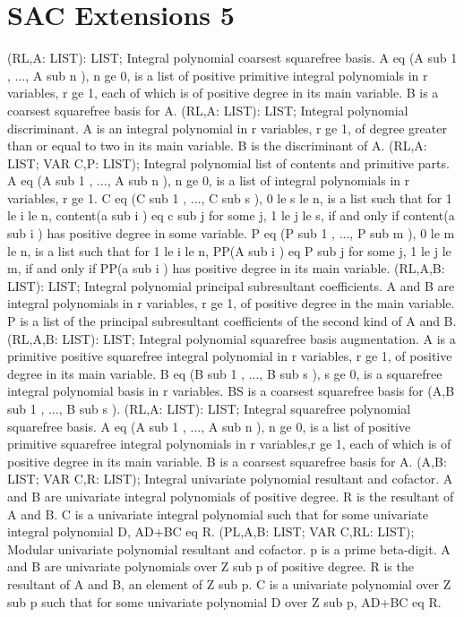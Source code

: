\section{ SAC Extensions 5  } 
 (RL,A: LIST): LIST; \eproc
\bcom Integral polynomial coarsest squarefree basis. A eq (A sub 1
, ..., A sub n ), n ge 0, is a list of positive primitive integral
polynomials in r variables, r ge 1, each of which is of positive
degree in its main variable.  B is a coarsest squarefree basis
for A. \ecom 
{} (RL,A: LIST): LIST; \eproc
\bcom Integral polynomial discriminant. A is an integral polynomial
in r variables, r ge 1, of degree greater than or equal to two in
its main variable. B is the discriminant of A. \ecom 
{} (RL,A: LIST; VAR C,P: LIST); \eproc
\bcom Integral polynomial list of contents and primitive parts.
A eq (A sub 1 , ..., A sub n ), n ge 0, is a list of integral
polynomials in r variables, r ge 1.  C eq (C sub 1 , ..., C sub s ),
0 le s le n, is a list such that for 1 le i le n, content(a sub i ) eq
c sub j for some j, 1 le j le s, if and only if content(a sub i )
has positive degree in some variable.
P eq (P sub 1 , ..., P sub m ), 0 le m le n, is a list such that
for 1 le i le n, PP(A sub i ) eq P sub j for some j, 1 le j le m,
if and only if PP(a sub i ) has positive degree in its main
variable. \ecom 
{} (RL,A,B: LIST): LIST; \eproc
\bcom Integral polynomial principal subresultant coefficients. A and B
are integral polynomials in r variables, r ge 1, of positive degree
in the main variable.  P is a list of the principal subresultant
coefficients of the second kind of A and B. \ecom 
{} (RL,A,B: LIST): LIST; \eproc
\bcom Integral polynomial squarefree basis augmentation. A is a
primitive positive squarefree integral polynomial in r variables,
r ge 1, of positive degree in its main variable.
B eq (B sub 1 , ..., B sub s ), s ge 0, is a squarefree integral
polynomial basis in r variables.  BS is a coarsest squarefree
basis for (A,B sub 1 , ..., B sub s ). \ecom 
{} (RL,A: LIST): LIST; \eproc
\bcom Integral squarefree polynomial squarefree basis. A eq (A sub 1
, ..., A sub n ), n ge 0, is a list of positive primitive squarefree
integral polynomials in r variables,r ge 1, each of which is of
positive degree in its main variable.  B is a coarsest squarefree
basis for A. \ecom 
{} (A,B: LIST; VAR C,R: LIST); \eproc
\bcom Integral univariate polynomial resultant and cofactor. A and B are
univariate integral polynomials of positive degree.  R is the
resultant of A and B.  C is a univariate integral polynomial such
that for some univariate integral polynomial D, AD+BC eq R. \ecom 
{} (PL,A,B: LIST; VAR C,RL: LIST); \eproc
\bcom Modular univariate polynomial resultant and cofactor. p is a
prime beta-digit.  A and B are univariate polynomials over
Z sub p of positive degree.  R is the resultant of A and B,
an element of Z sub p.  C is a univariate polynomial over
Z sub p such that for some univariate polynomial D over
Z sub p, AD+BC eq R. \ecom 
